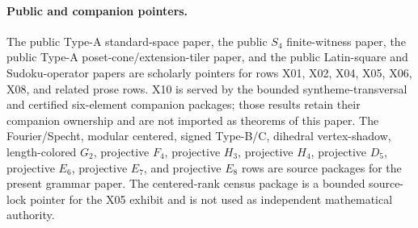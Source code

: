 \paragraph{Public and companion pointers.}
The public Type-A standard-space paper, the public \(S_4\) finite-witness paper, the public Type-A poset-cone/extension-tiler paper, and the public Latin-square and Sudoku-operator papers are scholarly pointers for rows X01, X02, X04, X05, X06, X08, and related prose rows.  X10 is served by the bounded syntheme-transversal and certified six-element companion packages; those results retain their companion ownership and are not imported as theorems of this paper.  The Fourier/Specht, modular centered, signed Type-B/C, dihedral vertex-shadow, length-colored \(G_2\), projective \(F_4\), projective \(H_3\), projective \(H_4\), projective \(D_5\), projective \(E_6\), projective \(E_7\), and projective \(E_8\) rows are source packages for the present grammar paper.  The centered-rank census package is a bounded source-lock pointer for the X05 exhibit and is not used as independent mathematical authority.
